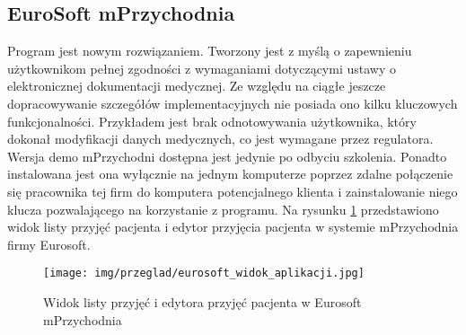 \subsection{EuroSoft mPrzychodnia}
Program jest nowym rozwiązaniem. Tworzony jest z myślą o zapewnieniu użytkownikom pełnej zgodności z wymaganiami dotyczącymi ustawy o elektronicznej dokumentacji medycznej. Ze względu na ciągłe jeszcze dopracowywanie szczegółów implementacyjnych nie posiada ono kilku kluczowych funkcjonalności. Przykładem jest brak odnotowywania użytkownika, który dokonał modyfikacji danych medycznych, co jest wymagane przez regulatora. Wersja demo mPrzychodni dostępna jest jedynie po odbyciu szkolenia. Ponadto instalowana jest ona wyłącznie na jednym komputerze poprzez zdalne połączenie się pracownika tej firm do komputera potencjalnego klienta i zainstalowanie niego klucza pozwalającego na korzystanie z programu. 
Na rysunku \ref{eurosoft_widok_aplikacji} przedstawiono widok listy przyjęć pacjenta i edytor przyjęcia pacjenta w systemie mPrzychodnia firmy Eurosoft.
\begin{figure}[htb]
    \begin{center}
	\texttt{[image: img/przeglad/eurosoft\_widok\_aplikacji.jpg]}
	\caption{Widok listy przyjęć i edytora przyjęć pacjenta w Eurosoft mPrzychodnia}
	\label{eurosoft_widok_aplikacji}
    \end{center}
\end{figure}


